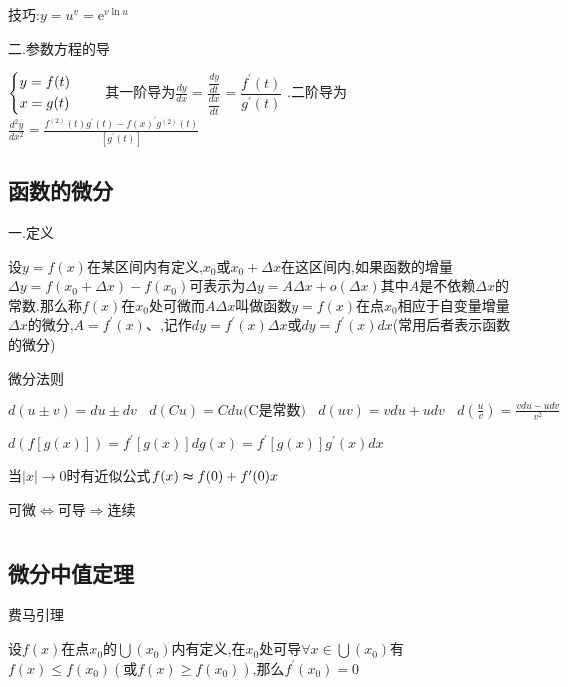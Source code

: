 \documentclass[utf8]{ctexart}
\begin{document}
技巧:$y=u^v=\text{e}^{v\ln u}$

二.参数方程的导

$\begin{dcases}
    y=f(t)\\x=g(t)
    \end{dcases}$
\ \ \ \ 其一阶导为$\displaystyle \frac{dy}{dx} =\frac{\dfrac{dy}{dt} }{\dfrac{dx}{dt} } =\dfrac{f^\prime (t)}{g^\prime (t)} $ .二阶导为$\displaystyle \frac{d^2 y}{d x^2}= \frac{ f^{(2)} (t) g^\prime (t) - f(x)^\prime  g^{(2)}(t)}{\left[g^\prime (t)\right]}$\\

\subsection{\heiti 函数的微分}

一.定义

设$y=f(x)$在某区间内有定义,$x_0$或$x_0+\Delta x$在这区间内,如果函数的增量$\Delta y= f(x_0+\Delta x)-f(x_0)$可表示为$\Delta y=A\Delta x+o(\Delta x)$其中$A$是不依赖$\Delta x$的常数.那么称$f(x)$在$x_0$处可微而$A\Delta x$叫做函数$y=f(x)$在点$x_0$相应于自变量增量$\Delta x$的微分,$A=f^\prime (x)$、,记作$dy=f^\prime (x)\Delta x$或$dy=f^\prime (x)dx$(常用后者表示函数的微分)

微分法则

$\displaystyle d(u\pm v)=du\pm dv\ \ \ \ d(Cu)=Cdu\text{(C是常数)}\ \ \ \ d(uv)=vdu+udv\ \ \ \ d(\frac{u}{v})=\frac{vdu-udv}{v^2}$

$d(f[g(x)])=f^\prime [g(x)]dg(x)=f^\prime [g(x)]g^\prime (x)dx$

当$|x|\to 0$时有近似公式$f(x)\thickapprox f(0)+f^\prime(0)x$

可微$\Longleftrightarrow $可导$\Longrightarrow $连续

\newpage

\section{}

\subsection{\heiti 微分中值定理}

费马引理

设$f(x)$在点$x_0$的$\bigcup (x_0)$内有定义,在$x_0$处可导$\forall x \in \bigcup (x_0)$有$f(x)\leqslant f(x_0)(\text{或}f(x)\geqslant f(x_0))$,那么$f^\prime (x_0)=0$
\end{document}
